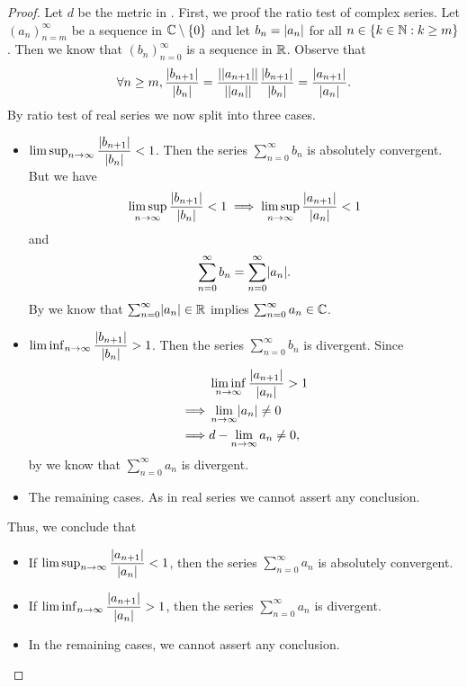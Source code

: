 \begin{proof}
  Let \(d\) be the metric in .
  First, we proof the ratio test of complex series.
  Let \((a_n)_{n = m}^\infty\) be a sequence in \(\mathbb{C} \setminus \left\lbrace0\right\rbrace\) and let \(b_n = \left\lvert a_n\right\rvert\) for all \(n \in \left\lbrace k \in \mathbb{N} : k \geq m\right\rbrace\).
  Then we know that \((b_n)_{n = 0}^\infty\) is a sequence in \(\mathbb{R}\).
  Observe that
  \[
    \forall n \geq m, \dfrac{\left\lvert b_{n + 1}\right\rvert}{\left\lvert b_n\right\rvert} = \dfrac{\left\lvert\left\lvert a_{n + 1}\right\rvert\right\rvert}{\left\lvert\left\lvert a_n\right\rvert\right\rvert} \dfrac{\left\lvert b_{n + 1}\right\rvert}{\left\lvert b_n\right\rvert} = \dfrac{\left\lvert a_{n + 1}\right\rvert}{\left\lvert a_n\right\rvert}.
  \]
  By ratio test of real series we now split into three cases.
  \begin{itemize}
    \item \(\limsup_{n \to \infty} \dfrac{\left\lvert b_{n + 1}\right\rvert}{\left\lvert b_n\right\rvert} < 1\).
          Then the series \(\sum_{n = 0}^\infty b_n\) is absolutely convergent.
          But we have
          \[
            \limsup_{n \to \infty} \dfrac{\left\lvert b_{n + 1}\right\rvert}{\left\lvert b_n\right\rvert} < 1 \implies \limsup_{n \to \infty} \dfrac{\left\lvert a_{n + 1}\right\rvert}{\left\lvert a_n\right\rvert} < 1
          \]
          and
          \[
            \sum_{n = 0}^\infty b_n = \sum_{n = 0}^\infty \abs{a_n}.
          \]
          By  we know that \(\sum_{n = 0}^\infty \abs{a_n} \in \R\) implies \(\sum_{n = 0}^\infty a_n \in \mathbb{C}\).
    \item \(\liminf_{n \to \infty} \dfrac{\left\lvert b_{n + 1}\right\rvert}{\left\lvert b_n\right\rvert} > 1\).
          Then the series \(\sum_{n = 0}^\infty b_n\) is divergent.
          Since
          \begin{align*}
                     & \liminf_{n \to \infty} \dfrac{\abs{a_{n + 1}}}{\abs{a_n}} > 1 \\
            \implies & \lim_{n \to \infty} \abs{a_n} \neq 0                          \\
            \implies & d - \lim_{n \to \infty} a_n \neq 0,
          \end{align*}
          by  we know that \(\sum_{n = 0}^\infty a_n\) is divergent.
    \item The remaining cases.
          As in real series we cannot assert any conclusion.
  \end{itemize}
  Thus, we conclude that
  \begin{itemize}
    \item If \(\limsup_{n \to \infty} \dfrac{\left\lvert a_{n + 1}\right\rvert}{\left\lvert a_n\right\rvert} < 1\), then the series \(\sum_{n = 0}^\infty a_n\) is absolutely convergent.
    \item If \(\liminf_{n \to \infty} \dfrac{\left\lvert a_{n + 1}\right\rvert}{\left\lvert a_n\right\rvert} > 1\), then the series \(\sum_{n = 0}^\infty a_n\) is divergent.
    \item In the remaining cases, we cannot assert any conclusion.
  \end{itemize}


\end{proof}
